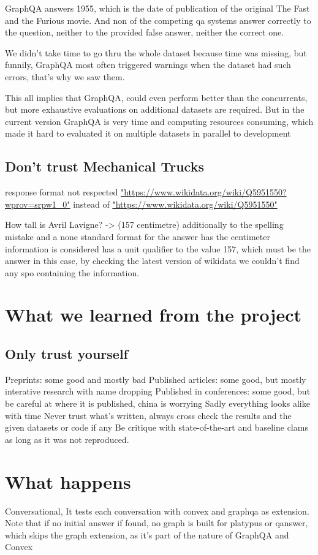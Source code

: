 GraphQA answers 1955, which is the date of publication of the original The Fast and the Furious movie. And non of the competing qa systems answer correctly to the question, neither to the provided false answer, neither the correct one.

We didn't take time to go thru the whole dataset because time was missing, but funnily, GraphQA most often triggered warnings when the dataset had such errors, that's why we saw them.

This all implies that GraphQA, could even perform better than the concurrents, but more exhaustive evaluations on additional datasets are required. But in the current version GraphQA is very time and computing resources consuming, which made it hard to evaluated it on multiple datasets in parallel to development 


\subsection{Don't trust Mechanical Trucks}
response format not respected \url{"https://www.wikidata.org/wiki/Q5951550?wprov=srpw1\_0"} instead of \url{"https://www.wikidata.org/wiki/Q5951550"}

How tall is Avril Lavigne? -> (157 centimetre) additionally to the spelling mistake and a none standard format for the answer has the centimeter information is considered has a unit qualifier to the value 157, which must be the answer in this case, by checking the latest version of wikidata we couldn't find any spo containing the information.


\section{What we learned from the project}
\subsection{Only trust yourself}
Preprints: some good and mostly bad
Published articles: some good, but mostly interative research with name dropping
Published in conferences: some good, but be careful at where it is published, china is worrying
Sadly everything looks alike with time
Never trust what's written, always cross check the results and the given datasets or code if any
Be critique with state-of-the-art and baseline clams as long as it was not reproduced.



\section{What happens}

Conversational,
It tests each conversation with convex and graphqa as extension.
Note that if no initial answer if found, no graph is built for platypus or qanswer, which skips the graph extension, as it's part of the nature of GraphQA and Convex